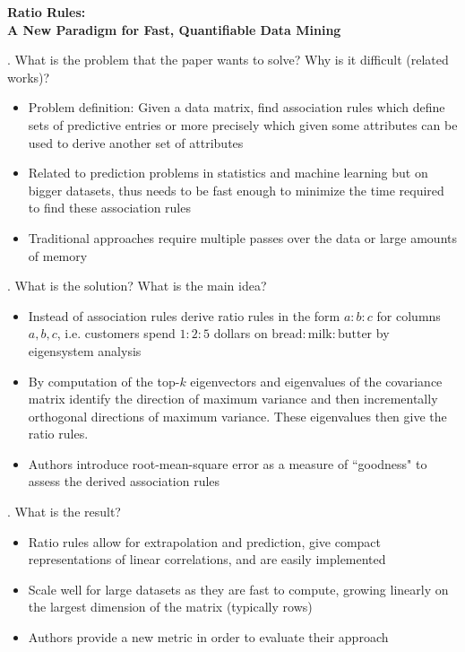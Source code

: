 \documentclass[12pt]{article}
\begin{document}
 

{\Large\centering
    \textbf{Ratio Rules:\\A New Paradigm for Fast, Quantifiable Data Mining}
\par}

\bigskip

. What is the problem that the paper wants to solve? Why is it difficult (related works)?

\begin{itemize}
    \item Problem definition: Given a data matrix, find association rules which define sets of predictive entries or more precisely which given some attributes can be used to derive another set of attributes
    \item Related to prediction problems in statistics and machine learning but on bigger datasets, thus needs to be fast enough to minimize the time required to find these association rules
    \item Traditional approaches require multiple passes over the data or large amounts of memory
\end{itemize}

. What is the solution? What is the main idea?

\begin{itemize}
    \item Instead of association rules derive ratio rules in the form $a:b:c$ for columns $a,b,c$, i.e. customers spend $1:2:5$ dollars on $\text{bread}:\text{milk}:\text{butter}$ by eigensystem analysis
    \item By computation of the top-$k$ eigenvectors and eigenvalues of the covariance matrix identify the direction of maximum variance and then incrementally orthogonal directions of maximum variance. These eigenvalues then give the ratio rules.
    \item Authors introduce root-mean-square error as a measure of ``goodness" to assess the derived association rules
\end{itemize}

. What is the result?

\begin{itemize}
    \item Ratio rules allow for extrapolation and prediction, give compact representations of linear correlations, and are easily implemented
    \item Scale well for large datasets as they are fast to compute, growing linearly on the largest dimension of the matrix (typically rows)
    \item Authors provide a new metric in order to evaluate their approach
\end{itemize}
\end{document}
